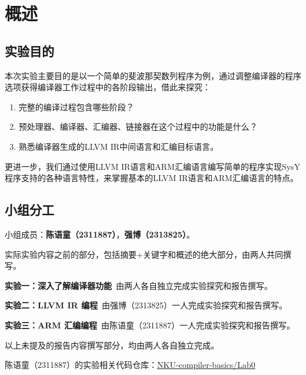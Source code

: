 \documentclass[UTF8,a4paper,10pt]{ctexart}
\begin{document}
\newpage
\tableofcontents
\newpage
\setcounter{page}{1}
\section{概述}
\subsection{实验目的}
本次实验主要目的是以一个简单的斐波那契数列程序为例，通过调整编译器的程序选项获得编译器工作过程中的各阶段输出，借此来探究：
\begin{enumerate}
	\item 完整的编译过程包含哪些阶段？
	\item 预处理器、编译器、汇编器、链接器在这个过程中的功能是什么？
	\item 熟悉编译器生成的LLVM IR中间语言和汇编目标语言。 
\end{enumerate}

更进一步，我们通过使用LLVM IR语言和ARM汇编语言编写简单的程序实现SysY程序支持的各种语言特性，来掌握基本的LLVM IR语言和ARM汇编语言的特点。

\vspace{1em}

\subsection{小组分工}

小组成员：\textbf{陈语童（2311887）}，\textbf{强博（2313825）}。

\vspace{1em}

实际实验内容之前的部分，包括摘要+关键字和概述的绝大部分，由两人共同撰写。

\textbf{实验一：深入了解编译器功能}~由两人各自独立完成实验探究和报告撰写。

\textbf{实验二：LLVM IR 编程}~由强博（2313825）一人完成实验探究和报告撰写。

\textbf{实验三：ARM 汇编编程}~由陈语童（2311887）一人完成实验探究和报告撰写。

以上未提及的报告内容撰写部分，均由两人各自独立完成。

\vspace{1em}

陈语童（2311887）的实验相关代码仓库：\href{https://github.com/bugp3ssy666/NKU-compiler-basics/tree/main/Lab0}{NKU-compiler-basics/Lab0}
\end{document}
